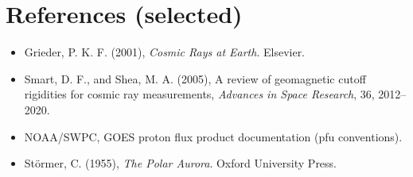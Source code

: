 \documentclass[11pt]{article}
\begin{document}
\section{References (selected)}
\begin{itemize}
  \item Grieder, P. K. F. (2001), \emph{Cosmic Rays at Earth}. Elsevier.
  \item Smart, D. F., and Shea, M. A. (2005), A review of geomagnetic cutoff rigidities for cosmic ray measurements, \emph{Advances in Space Research}, 36, 2012--2020.
  \item NOAA/SWPC, GOES proton flux product documentation (pfu conventions).
  \item St\"ormer, C. (1955), \emph{The Polar Aurora}. Oxford University Press.
\end{itemize}
\end{document}
